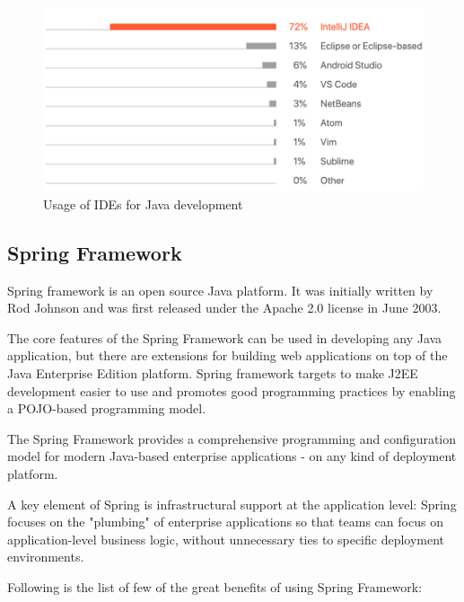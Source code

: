 \documentclass[thesis=M,english,hidelinks]{FITthesis}[2019/12/23]
\begin{document}
\begin{figure}
	\centering
	\includegraphics[width=0.7\linewidth]{ide_poll_results}
	\caption{Usage of IDEs for Java development}
	\label{fig:idepollresults}
\end{figure}

\subsection{Spring Framework}

Spring framework is an open source Java platform. It was initially written by Rod Johnson and was first released under the Apache 2.0 license in June 2003.

The core features of the Spring Framework can be used in developing any Java application, but there are extensions for building web applications on top of the Java Enterprise Edition platform. Spring framework targets to make \gls{J2EE} development easier to use and promotes good programming practices by enabling a \gls{POJO}-based programming model.

The Spring Framework provides a comprehensive programming and configuration model for modern Java-based enterprise applications - on any kind of deployment platform.

A key element of Spring is infrastructural support at the application level: Spring focuses on the "plumbing" of enterprise applications so that teams can focus on application-level business logic, without unnecessary ties to specific deployment environments.

Following is the list of few of the great benefits of using Spring Framework:
\end{document}
